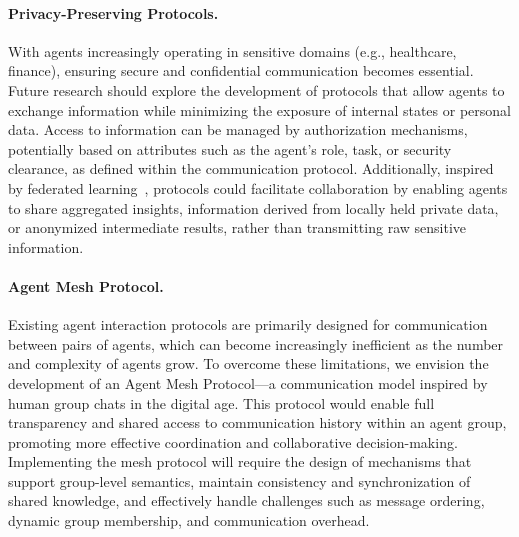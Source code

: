 \documentclass[10pt,preprint]{article}
\begin{document}
\paragraph{Privacy-Preserving Protocols.}
With agents increasingly operating in sensitive domains (e.g., healthcare, finance), ensuring secure and confidential communication becomes essential.
Future research should explore the development of protocols that allow agents to exchange information while minimizing the exposure of internal states or personal data. 
Access to information can be managed by authorization mechanisms, potentially based on attributes such as the agent’s role, task, or security clearance, as defined within the communication protocol. 
Additionally, inspired by federated learning~\citep{zhang2021survey}, protocols could facilitate collaboration by enabling agents to share aggregated insights, information derived from locally held private data, or anonymized intermediate results, rather than transmitting raw sensitive information.

\paragraph{Agent Mesh Protocol.}
Existing agent interaction protocols are primarily designed for communication between pairs of agents, which can become increasingly inefficient as the number and complexity of agents grow.
To overcome these limitations, we envision the development of an Agent Mesh Protocol—a communication model inspired by human group chats in the digital age.
This protocol would enable full transparency and shared access to communication history within an agent group, promoting more effective coordination and collaborative decision-making.
Implementing the mesh protocol will require the design of mechanisms that support group-level semantics, maintain consistency and synchronization of shared knowledge, and effectively handle challenges such as message ordering, dynamic group membership, and communication overhead.

\end{document}
